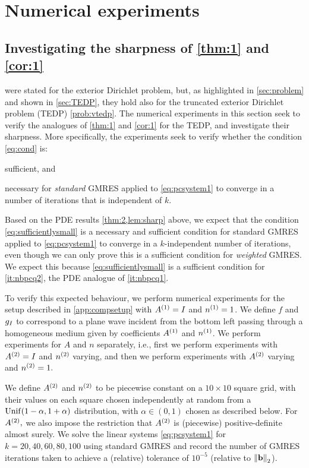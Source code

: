 \section{Numerical experiments}\label{sec:num}

\subsection{Investigating the sharpness of \cref{thm:1} and \cref{cor:1}}

 were stated for the exterior Dirichlet problem, but, as highlighted in \cref{sec:problem} and shown in \cref{sec:TEDP}, they hold also for the truncated exterior Dirichlet problem (TEDP) \cref{prob:vtedp}. The numerical experiments in this section seek to verify the analogues of \cref{thm:1} and \cref{cor:1} for the TEDP, and investigate their sharpness. More specifically, the experiments seek to verify whether the condition \cref{eq:cond} is:
\ben
\item sufficient, and
\item necessary
  \een
  for \emph{standard} GMRES applied to \cref{eq:pcsystem1} to converge in a number of iterations that is independent of $k.$

Based on the PDE results \cref{thm:2,lem:sharp} above, we expect that the condition \cref{eq:sufficientlysmall} is a necessary and sufficient condition for standard GMRES applied to \cref{eq:pcsystem1} to converge in a $k$-independent number of iterations, even though we can only prove this is a sufficient condition for \emph{weighted} GMRES. We expect this because \cref{eq:sufficientlysmall} is a sufficient condition for \cref{it:nbpcq2}, the PDE analogue of \cref{it:nbpcq1}.

To verify this expected behaviour, we perform numerical experiments for the setup described in \cref{app:compsetup} with ${A}^{(1)} = I$ and ${n}^{(1)} = 1$. We define $f$ and $g_{I}$ to correspond to a plane wave incident from the bottom left passing through a homogeneous medium given by coefficients ${A}^{(1)}$ and ${n}^{(1)}$. We perform experiments for $A$ and $n$ separately, i.e., first we perform experiments with ${A}^{(2)}=I$ and ${n}^{(2)}$ varying, and then we perform experiments with ${A}^{(2)}$ varying and ${n}^{(2)}=1.$

We define ${A}^{(2)}$ and ${n}^{(2)}$ to be piecewise constant on a $10\times10$ square grid, with their values on each square chosen independently at random from a $\Unif\mleft(1-\alpha,1+\alpha\mright)$ distribution, with $\alpha \in (0,1)$ chosen as described below. For ${A}^{(2)},$ we also impose the restriction that ${A}^{(2)}$ is (piecewise) positive-definite almost surely. We solve the linear systems \cref{eq:pcsystem1} for $k = 20,40,60,80,100$ using standard GMRES and record the number of GMRES iterations taken to achieve a (relative) tolerance of $10^{-5}$ (relative to $\Nt{\bfb}$).

